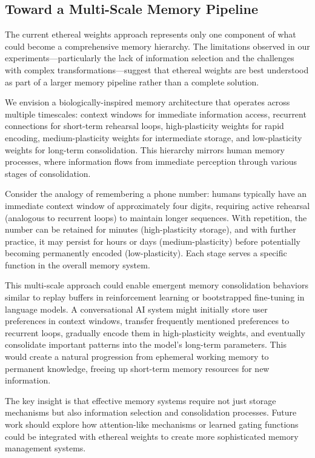 \documentclass{article} %
\begin{document}
\subsection{Toward a Multi-Scale Memory Pipeline}

The current ethereal weights approach represents only one component of what could become a comprehensive memory hierarchy. The limitations observed in our experiments—particularly the lack of information selection and the challenges with complex transformations—suggest that ethereal weights are best understood as part of a larger memory pipeline rather than a complete solution.

We envision a biologically-inspired memory architecture that operates across multiple timescales: context windows for immediate information access, recurrent connections for short-term rehearsal loops, high-plasticity weights for rapid encoding, medium-plasticity weights for intermediate storage, and low-plasticity weights for long-term consolidation. This hierarchy mirrors human memory processes, where information flows from immediate perception through various stages of consolidation.

Consider the analogy of remembering a phone number: humans typically have an immediate context window of approximately four digits, requiring active rehearsal (analogous to recurrent loops) to maintain longer sequences. With repetition, the number can be retained for minutes (high-plasticity storage), and with further practice, it may persist for hours or days (medium-plasticity) before potentially becoming permanently encoded (low-plasticity). Each stage serves a specific function in the overall memory system.

This multi-scale approach could enable emergent memory consolidation behaviors similar to replay buffers in reinforcement learning or bootstrapped fine-tuning in language models. A conversational AI system might initially store user preferences in context windows, transfer frequently mentioned preferences to recurrent loops, gradually encode them in high-plasticity weights, and eventually consolidate important patterns into the model's long-term parameters. This would create a natural progression from ephemeral working memory to permanent knowledge, freeing up short-term memory resources for new information.

The key insight is that effective memory systems require not just storage mechanisms but also information selection and consolidation processes. Future work should explore how attention-like mechanisms or learned gating functions could be integrated with ethereal weights to create more sophisticated memory management systems.
\end{document}
